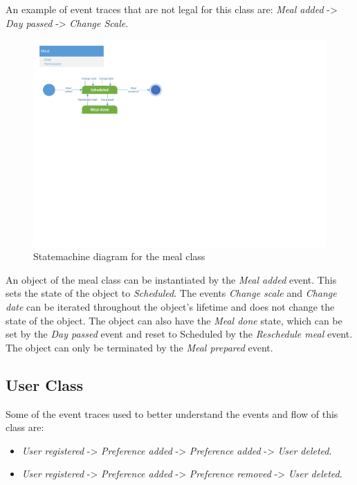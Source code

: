 An example of event traces that are not legal for this class are: \textit{Meal added} -> \textit{Day passed} -> \textit{Change Scale}.

\begin{figure}[H]
	\centering
	\includegraphics[clip=true, trim=0.5cm 13cm 16.5cm 0.5cm]{Grafik/FoodPlanner/Meal.pdf}
	\caption{Statemachine diagram for the meal class} \label{MealClass}
\end{figure}

An object of the meal class can be instantiated by the \textit{Meal added} event. This sets the state of the object to \textit{Scheduled}. The events \textit{Change scale} and \textit{Change date} can be iterated throughout the object's lifetime and does not change the state of the object. The object can also have the \textit{Meal done} state, which can be set by the \textit{Day passed} event and reset to Scheduled by the \textit{Reschedule meal} event. The object can only be terminated by the \textit{Meal prepared} event.

\subsection{User Class}
Some of the event traces used to better understand the events and flow of this class are:

\begin{itemize}
	\item \textit{User registered} -> \textit{Preference added} -> \textit{Preference added} -> \textit{User deleted}.
	\item \textit{User registered} -> \textit{Preference added} -> \textit{Preference removed} -> \textit{User deleted}.
\end{itemize}

